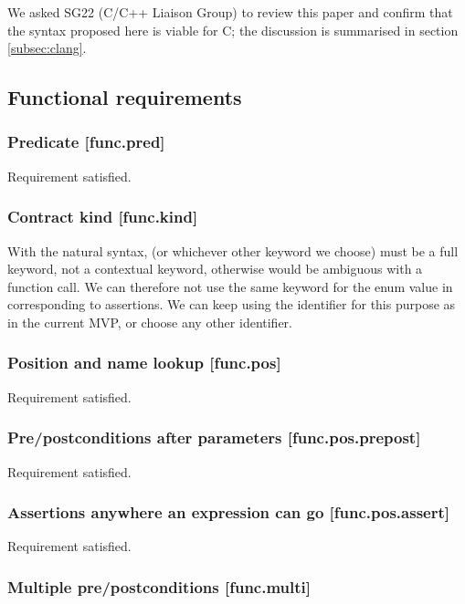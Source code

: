 We asked SG22 (C/C++ Liaison Group) to review this paper and confirm that the syntax proposed here is viable for C; the discussion is summarised in section \ref{subsec:clang}.

\subsection{Functional requirements}

\subsubsection{Predicate  [func.pred]}

Requirement satisfied.

\subsubsection{Contract kind  [func.kind]}

With the natural syntax,  (or whichever other keyword we choose) must be a full keyword, not a contextual keyword, otherwise  would be ambiguous with a function call. We can therefore not use the same keyword for the enum value in  corresponding to assertions. We can keep using the identifier  for this purpose as in the current MVP, or choose any other identifier.

\subsubsection{Position and name lookup [func.pos]}

Requirement satisfied.

\subsubsection{Pre/postconditions after parameters [func.pos.prepost]}

Requirement satisfied.

\subsubsection{Assertions anywhere an expression can go [func.pos.assert]}

Requirement satisfied.

\subsubsection{Multiple pre/postconditions  [func.multi]}

